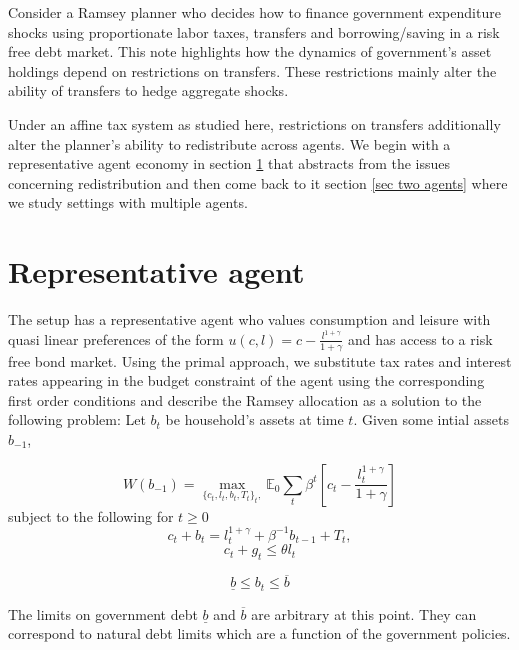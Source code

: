 \documentclass[thmsb,11pt]{article}
\begin{document}
Consider a Ramsey planner who decides how to finance government expenditure shocks using proportionate labor taxes, transfers and borrowing/saving in a risk free debt market. This note highlights how the dynamics of government's asset holdings depend on  restrictions on transfers. These restrictions mainly alter the ability of transfers to hedge aggregate shocks.


Under an affine tax system as studied here, restrictions on transfers  additionally alter the planner's ability to redistribute across agents. We begin with a representative agent economy in section \ref{sec rep agent} that abstracts from the issues concerning redistribution and then come back to it section \ref{sec two agents} where we study settings with multiple agents.

\section{Representative agent}
\label{sec rep agent} 
The setup has a representative agent who values consumption and leisure with quasi linear preferences of the form $u(c,l)=c-\frac{l^{1+\gamma}}{1+\gamma}$ and has access to a risk free bond market. Using the primal approach, we substitute tax rates and interest rates appearing in the budget constraint of the agent using the corresponding first order conditions and describe the Ramsey allocation as a solution to the following problem: Let $b_t$ be household's assets at time $t$. Given some intial assets $b_{-1}$, 

\begin{equation}
W(b_{-1})= \max_{\{c_t,l_t,b_{t},T_t\}_t,}\mathbb{E}_0\sum_{t}\beta^t \left[c_t-\frac{l_t^{1+\gamma}}{1+\gamma}\right]
\end{equation}
subject to the following for $t\geq 0$
\begin{equation}
\label{eq imp}
c_t+b_{t}=l_t^{1+\gamma}+\beta^{-1}b_{t-1}+T_t ,
\end{equation}
\begin{equation}
c_t+g_t \leq \theta l_t 
\end{equation}

\begin{equation}
\label{eq bounds}
\underline{b}\leq b_t\leq \overline{b}
\end{equation}

The limits on government debt  $\underline{b}$ and $\overline{b}$ are arbitrary at this point. They can correspond to natural debt limits which are a function of the government policies. 
\end{document}
